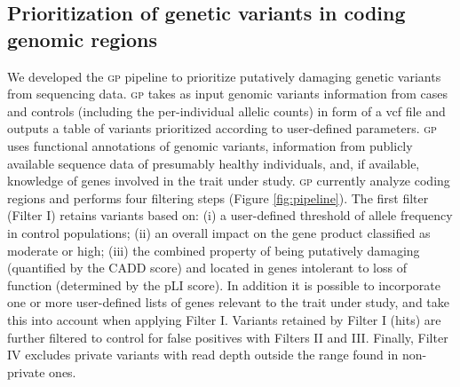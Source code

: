 \documentclass[fleqn,10pt]{wlscirep}
\newcommand{\gp}[]{\textsc{gp }}
\begin{document}
\subsection*{Prioritization of genetic variants in coding genomic regions} 
We developed the \gp pipeline to prioritize putatively damaging genetic variants from sequencing data. \gp takes as input genomic variants information from cases and controls (including the per-individual allelic counts) in form of a vcf file and outputs a table of variants prioritized according to user-defined parameters. \gp uses functional annotations of genomic variants, information from publicly available sequence data of presumably healthy individuals, and, if available, knowledge of genes involved in the trait under study. \gp currently analyze coding regions and performs four filtering steps (Figure \ref{fig:pipeline}). The first filter (Filter I) retains variants based on: (i) a user-defined threshold of allele frequency in control populations; (ii) an overall impact on the gene product classified as moderate or high\cite{mclaren2016ensembl}; (iii) the combined property of being putatively damaging (quantified by the CADD score\cite{rentzsch2019cadd}) and located in genes intolerant to loss of function (determined by the pLI score\cite{karczewski2020mutational}). In addition it is possible to incorporate one or more user-defined lists of genes relevant to the trait under study, and take this into account when applying Filter I. Variants retained by Filter I (hits) are further filtered to control for false positives with Filters II and III. Finally, Filter IV excludes private variants with read depth outside the range found in non-private ones.   

\end{document}
